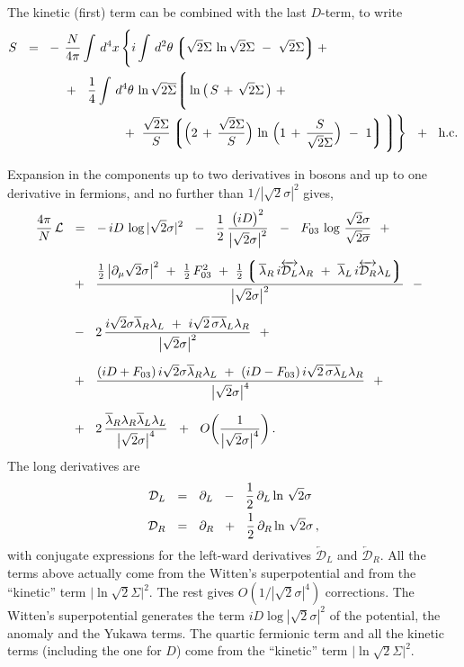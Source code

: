 \documentclass[epsfig,12pt]{article}
\newcommand{\cell}{{\mathcal L}}
\newcommand{\p}{\partial}
\newcommand{\ov}{\overline}
\newcommand{\md}{\mathcal{D}}
\newcommand{\lgr}{\left\lgroup}
\newcommand{\rgr}{\right\rgroup}
\begin{document}
	The kinetic (first) term can be combined with the last $ D $-term, to write
\begin{align}
%
\notag
	S    ~~=~~ &    -\, \frac{N}{4\pi} \int\, d^4x\,
			\Bigg\{
			i \int\, d^2\theta 
			\lgr \sqrt{2}\Sigma\, \ln \sqrt{2}\Sigma  ~-~ \sqrt{2}\Sigma \rgr
			+~ 
	\\
%
	&
			\quad
			~+~~ 
			\frac{1}{4} \int\, d^4\theta\,
			\ln \sqrt{2}\ov\Sigma
			\Bigg\lgroup
			\ln \big(\, S \,+\, \sqrt{2}\Sigma \,\big)  
			~+~
			\\
%
\notag
	&
			\qquad\qquad\quad~~
			~+~
			\frac{\sqrt{2}\Sigma}{S} 
			\lgr \Big( 2 \,+\, \frac{\sqrt{2}\Sigma}{S} \Big)\, \ln\, \Big( 1 \,+\, \frac{S}{\sqrt{2}\Sigma} \Big) ~-~ 1 \rgr
			\Bigg\rgroup
			\Bigg\}
	~~+~~ \text{h.c.}
\end{align}


	Expansion in the components up to two derivatives in bosons and up to one derivative in fermions,
	and no further than $ 1 / | \sqrt{2}\sigma|^2 $ gives,
\begin{align}
%
\notag
	\frac{4\pi}{N}\, \cell &    ~~=~~
	-\,iD\, \log |\sqrt{2}\sigma|^2  ~~-~~  \frac{1}{2}\, \frac{ \big(i D\big)^2 } { \big|\sqrt{2}\sigma\big|^2 }
	~~-~~ F_{03}\, \log\, \frac{\sqrt{2}\sigma}{\sqrt{2}\ov\sigma}
	~~+~~
	\\[2mm]
%
\notag
	&
	~~+~~ \frac{
		\frac{1}{2}\, \big|\p_\mu \sqrt{2}\sigma\big|^2  ~+~  \frac{1}{2}\,F_{03}^2  ~+~
		\frac{1}{2} \lgr\, \ov\lambda{}_R\, i\overleftrightarrow{\md_L} \lambda_R  ~+~ 
				   \ov\lambda{}_L\, i\overleftrightarrow{\md_R} \lambda_L \rgr
		} { \big|\sqrt{2}\sigma\big|^2 }
	~~-~~
	\\[2mm]
%
	&
	~~-~~ 2\,\frac{
			i\sqrt{2}\sigma\ov\lambda{}_R\lambda_L  ~+~  
			i\sqrt{2}\,\ov{\sigma\lambda}{}_L\lambda_R
		} { \big|\sqrt{2}\sigma\big|^2 }
	~~+~~
	\\[2mm]
%
\notag
	&
	~~+~~
	\frac{	(iD + F_{03})\, i\sqrt{2}\sigma \ov\lambda{}_R\lambda_L ~+~
		(iD - F_{03})\, i\sqrt{2}\,\ov{\sigma \lambda}{}_L\lambda_R  }
		{ \big|\sqrt{2}\sigma\big|^4 }
	~~+~~
	\\[2mm]
%
\notag
	&
	~~+~~ 2\, \frac{
			\ov\lambda{}_R \lambda_R \ov\lambda{}_L \lambda_L
		} { \big|\sqrt{2}\sigma\big|^4 }
	~~+~~ O\bigg(\frac{1}{\big|\sqrt{2}\sigma\big|^4}\bigg)\,.
\end{align}
	The long derivatives are
\begin{align}
%
\notag
	\md_L &    ~~=~~    \p_L  ~~-~~  \frac{1}{2}\, \p_L \ln\, \sqrt{2}\sigma
	\\
%
	\md_R &    ~~=~~    \p_R  ~~+~~  \frac{1}{2}\, \p_R \ln\, \sqrt{2}\sigma\,,
\end{align}
	with conjugate expressions for the left-ward derivatives 
	$ \overleftarrow{\md}{}_L $ and $ \overleftarrow{\md}{}_R $.
	All the terms above actually come from the Witten's superpotential and 
	from the ``kinetic'' term $ \big| \ln \sqrt{2}\Sigma \big|^2 $.
	The rest gives $ O (1/|\sqrt{2}\sigma|^4) $ corrections.
	The Witten's superpotential generates the term $ iD \log |\sqrt{2}\sigma|^2 $ of the potential, 
	the anomaly and the Yukawa terms.
	The quartic fermionic term and all the kinetic terms (including the one for $ D $) 
	come from the ``kinetic'' term $ \big| \ln \sqrt{2}\Sigma \big|^2 $.
\end{document}
